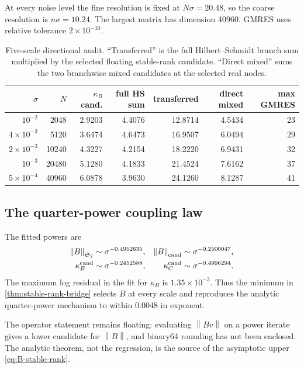 \documentclass[11pt]{article}
\theoremstyle{definition}
\theoremstyle{remark}
\newcommand{\HS}{\mathfrak S_2}
\newcommand{\norm}[1]{\left\lVert #1\right\rVert}
\begin{document}
At every noise level the fine resolution is fixed at
\(N\sigma=20.48\), so the coarse resolution is \(n\sigma=10.24\).  The
largest matrix has dimension \(40960\).  GMRES uses relative tolerance
\(2\times10^{-10}\).

\begin{table}[H]
\centering
\small
\begin{tabular}{@{}rrrrrrr@{}}
\toprule
\(\sigma\) & \(N\) & \(\kappa_B\) cand. & full HS sum & transferred
& direct mixed & max GMRES \\
\midrule
\(10^{-2}\)      & 2048  & 2.9203 & 4.4076 & 12.8714 & 4.5434 & 23 \\
\(4\!\times\!10^{-3}\) & 5120  & 3.6474 & 4.6473 & 16.9507 & 6.0494 & 29 \\
\(2\!\times\!10^{-3}\) & 10240 & 4.3227 & 4.2154 & 18.2220 & 6.9431 & 32 \\
\(10^{-3}\)      & 20480 & 5.1280 & 4.1833 & 21.4524 & 7.6162 & 37 \\
\(5\!\times\!10^{-4}\) & 40960 & 6.0878 & 3.9630 & 24.1260 & 8.1287 & 41 \\
\bottomrule
\end{tabular}
\caption{Five-scale directional audit.  ``Transferred'' is the full
Hilbert--Schmidt branch sum multiplied by the selected floating stable-rank
candidate.  ``Direct mixed'' sums the two branchwise mixed candidates at the
selected real nodes.}
\label{tab:audit}
\end{table}

\subsection{The quarter-power coupling law}

The fitted powers are
\begin{align}
 \norm B_{\HS}&\sim\sigma^{-0.4952635},
 &\norm B_{\rm cand}&\sim\sigma^{-0.2500047},
 \label{eq:B-numeric-powers}\\
 \kappa_B^{\rm cand}&\sim\sigma^{-0.2452588},
 &\kappa_C^{\rm cand}&\sim\sigma^{-0.4996294}.
 \label{eq:stable-numeric-powers}
\end{align}
The maximum log residual in the fit for \(\kappa_B\) is
\(1.35\times10^{-3}\).  Thus the minimum in
\cref{thm:stable-rank-bridge} selects \(B\) at every scale and reproduces
the analytic quarter-power mechanism to within \(0.0048\) in exponent.

The operator statement remains floating: evaluating \(\norm{Bv}\) on a
power iterate gives a lower candidate for \(\norm B\), and binary64
rounding has not been enclosed.  The analytic theorem, not the regression,
is the source of the asymptotic upper \eqref{eq:B-stable-rank}.
\end{document}
